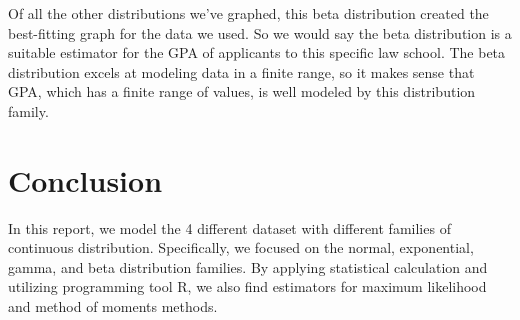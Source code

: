 \documentclass[12pt, a4paper, oneside]{report}
\begin{document}
Of all the other distributions we’ve graphed, this beta distribution created the best-fitting graph for the data we used. So we would say the beta distribution is a suitable estimator for the GPA of applicants to this specific law school. The beta distribution excels at modeling data in a finite range, so it makes sense that GPA, which has a finite range of values, is well modeled by this distribution family. 





\newpage
\chapter*{Conclusion}
In this report, we model the 4 different dataset with different families of continuous distribution. Specifically, we focused on the normal, exponential, gamma, and beta distribution families. By applying statistical calculation and utilizing programming tool R, we also find estimators for maximum likelihood and method of moments methods.
\end{document}
